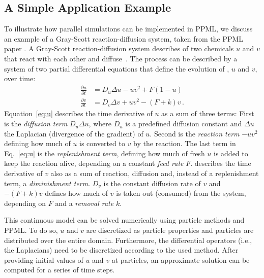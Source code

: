 \subsection{A Simple Application Example}
\label{sub:a_simple_application_example}
To illustrate how parallel simulations can be implemented in PPML, we discuss an example of a Gray-Scott reaction-diffusion system, taken from the
PPML paper \cite{Awile:2013}.
%
A Gray-Scott reaction-diffusion system describes  of two chemicals $u$ and $v$ that react with each other
and diffuse~\cite{Gray:1983}. The process can be described by a system of two partial differential equations that define the evolution of , $u$ and $v$, over time:
%
\begin{align}
	\label{eq:u}\frac{\partial{u}}{\partial{t}}& = {D_u}\Delta{u} - uv^2 + F(1 - u)\\
	\label{eq:v}\frac{\partial{v}}{\partial{t}}& = {D_v}\Delta{v} + uv^2 - (F + k)v \, . 
\end{align}
%
Equation~\ref{eq:u} describes the time derivative of $u$ as a sum of three terms: First is the \emph{diffusion term} ${D_u}\Delta{u}$, where $D_u$ is a predefined diffusion constant
and $\Delta{u}$ the Laplacian (divergence of the gradient) of $u$. Second is the \emph{reaction term} $- uv^2$ defining how much of $u$ is converted to $v$ by the reaction. The last term in Eq.~\ref{eq:u} is the \emph{replenishment term}, defining how much of fresh $u$ is added to keep the reaction alive,
depending on a constant \emph{feed rate} $F$.
%
 describes the time derivative of $v$ also as a sum of reaction, diffusion and, instead of a replenishment term, a \emph{diminishment term}. $D_v$ is the constant diffusion rate of $v$ and $- (F + k)v$ defines how much of $v$ is taken out (consumed) from the system, depending on
$F$ and a \emph{removal rate} $k$.%

This continuous model can be solved numerically using particle methods and PPML. To do so, $u$ and $v$ are discretized as particle properties and particles
are distributed over the entire domain. Furthermore, the differential operators (i.e., the Laplacians) need to be discretized according to the used method. After
providing initial values of $u$ and $v$ at particles, an approximate solution can be computed for a series of time steps.

